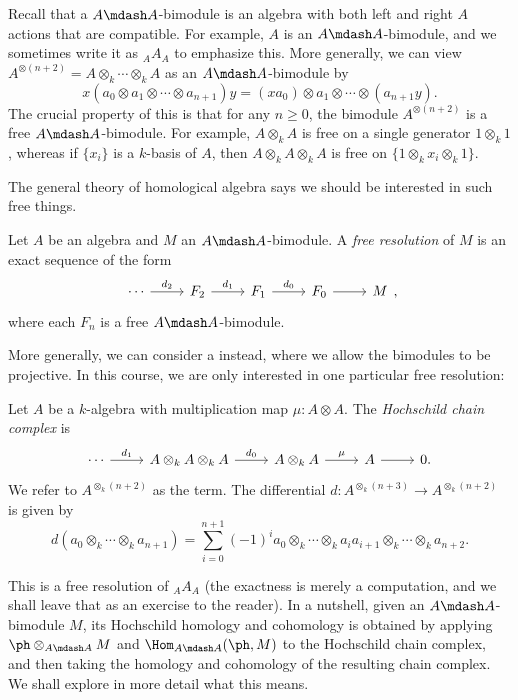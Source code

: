 \documentclass[a4paper]{article}
\begin{document}
Recall that a $A\mdash A$-bimodule is an algebra with both left and right $A$ actions that are compatible. For example, $A$ is an $A\mdash A$-bimodule, and we sometimes write it as $_AA_A$ to emphasize this. More generally, we can view $A^{\otimes (n + 2)} = A \otimes_k \cdots \otimes_k A$ as an $A\mdash A$-bimodule by
\[
  x(a_0 \otimes a_1 \otimes \cdots \otimes a_{n + 1})y = (x a_0) \otimes a_1 \otimes \cdots \otimes (a_{n + 1} y).
\]
The crucial property of this is that for any $n \geq 0$, the bimodule $A^{\otimes (n + 2)}$ is a free $A\mdash A$-bimodule. For example, $A \otimes_k A$ is free on a single generator $1 \otimes_k 1$, whereas if $\{x_i\}$ is a $k$-basis of $A$, then $A \otimes_k A \otimes_k A$ is free on $\{1 \otimes_k x_i \otimes_k 1\}$.

The general theory of homological algebra says we should be interested in such free things.
\begin{defi}
  Let $A$ be an algebra and $M$ an $A\mdash A$-bimodule. A \emph{free resolution} of $M$ is an exact sequence of the form
  \[
    \begin{tikzcd}
      \cdots \ar[r, "d_2"] & F_2 \ar[r, "d_1"] & F_1 \ar[r, "d_0"] & F_0 \ar[r] & M
    \end{tikzcd},
  \]
  where each $F_n$ is a free $A\mdash A$-bimodule.
\end{defi}
More generally, we can consider a  instead, where we allow the bimodules to be projective. In this course, we are only interested in one particular free resolution:

\begin{defi}
  Let $A$ be a $k$-algebra with multiplication map $\mu: A \otimes A$. The \emph{Hochschild chain complex} is
  \[
    \begin{tikzcd}
      \cdots \ar[r, "d_1"] & A \otimes_k A \otimes_k A \ar[r, "d_0"] & A \otimes_k A \ar[r, "\mu"] & A \ar[r] & 0.
    \end{tikzcd}
  \]
  We refer to $A^{\otimes_k(n + 2)}$ as the  term. The differential $d: A^{\otimes_k (n + 3)} \to A^{\otimes_k(n + 2)}$ is given by
  \[
    d(a_0 \otimes_k \cdots \otimes_k a_{n + 1}) = \sum_{i = 0}^{n + 1} (-1)^i a_0 \otimes_k \cdots \otimes_k a_i a_{i + 1} \otimes_k \cdots \otimes_k a_{n + 2}.
  \]
\end{defi}
This is a free resolution of $_AA_A$ (the exactness is merely a computation, and we shall leave that as an exercise to the reader). In a nutshell, given an $A\mdash A$-bimodule $M$, its Hochschild homology and cohomology is obtained by applying $\ph\otimes_{A\mdash A} M$ and $\Hom_{A\mdash A}(\ph, M)$ to the Hochschild chain complex, and then taking the homology and cohomology of the resulting chain complex. We shall explore in more detail what this means.
\end{document}
